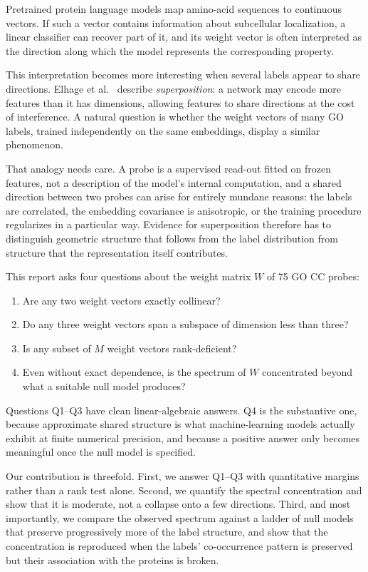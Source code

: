 \documentclass[11pt,a4paper]{article}
\begin{document}
Pretrained protein language models map amino-acid sequences to continuous vectors.
If such a vector contains information about subcellular localization, a linear
classifier can recover part of it, and its weight vector is often interpreted as
the direction along which the model represents the corresponding property.

This interpretation becomes more interesting when several labels appear to share
directions. Elhage et al.\ \cite{elhage2022toy} describe \emph{superposition}: a
network may encode more features than it has dimensions, allowing features to share
directions at the cost of interference. A natural question is whether the weight
vectors of many GO labels, trained independently on the same embeddings, display a
similar phenomenon.

That analogy needs care. A probe is a supervised read-out fitted on frozen
features, not a description of the model's internal computation, and a shared
direction between two probes can arise for entirely mundane reasons: the labels are
correlated, the embedding covariance is anisotropic, or the training procedure
regularizes in a particular way. Evidence for superposition therefore has to
distinguish geometric structure that follows from the label distribution from
structure that the representation itself contributes.

This report asks four questions about the weight matrix $W$ of 75 GO CC probes:

\begin{enumerate}[label=\textbf{Q\arabic*.},leftmargin=*]
    \item Are any two weight vectors exactly collinear?
    \item Do any three weight vectors span a subspace of dimension less than three?
    \item Is any subset of $M$ weight vectors rank-deficient?
    \item Even without exact dependence, is the spectrum of $W$ concentrated beyond
    what a suitable null model produces?
\end{enumerate}

Questions Q1--Q3 have clean linear-algebraic answers. Q4 is the substantive one,
because approximate shared structure is what machine-learning models actually
exhibit at finite numerical precision, and because a positive answer only becomes
meaningful once the null model is specified.

Our contribution is threefold. First, we answer Q1--Q3 with quantitative margins
rather than a rank test alone. Second, we quantify the spectral concentration and
show that it is moderate, not a collapse onto a few directions. Third, and most
importantly, we compare the observed spectrum against a ladder of null models that
preserve progressively more of the label structure, and show that the
concentration is reproduced when the labels' co-occurrence pattern is preserved but
their association with the proteins is broken.
\end{document}
